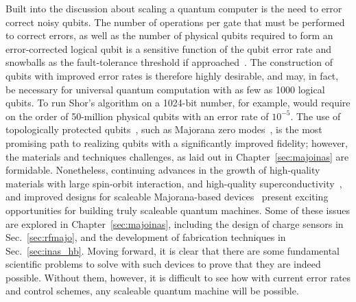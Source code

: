 Built into the discussion about scaling a quantum computer is the need to error correct noisy qubits. The number of operations per gate that must be performed to correct errors,
as well as the number of physical qubits required to form an error-corrected logical qubit is a sensitive function of the qubit error rate and snowballs as the fault-tolerance
threshold if approached~\cite{6657074,nature23460}. The construction of qubits with improved error rates is therefore highly desirable, and may, in fact, be necessary for universal
quantum computation with as few as 1000 logical qubits. To run Shor's algorithm on a 1024-bit number, for example, would require on the order of 50-million physical qubits with
an error rate of $10^{-5}$. The use of topologically protected qubits~\cite{RevModPhys.80.1083}, such as Majorana zero modes~\cite{s41578-018-0003-1}, is the most promising path
to realizing qubits with a significantly improved fidelity; however, the materials and techniques challenges, as laid out in Chapter~\ref{sec:majoinas} are formidable.
Nonetheless, continuing advances in the growth of high-quality materials with large spin-orbit interaction, and high-quality superconductivity~\cite{PhysRevLett.119.136803},
and improved designs for scaleable Majorana-based devices~\cite{PhysRevB.95.235305,Plugge} present exciting opportunities for building truly scaleable quantum machines.
Some of these issues are explored in Chapter~\ref{sec:majoinas}, including the design of charge sensors in Sec.~\ref{sec:rfmajo}, and the development of fabrication techniques
in Sec.~\ref{sec:inas_hb}. Moving forward, it is clear that there are some fundamental scientific problems to solve with such devices to prove that they are indeed possible.
Without them, however, it is difficult to see how with current error rates and control schemes, any scaleable quantum machine will be possible.

